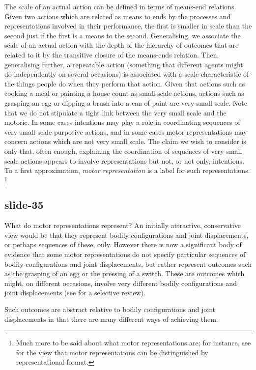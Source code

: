 \documentclass[12pt,\papersize]{extarticle}
\begin{document}
The scale of an actual action can be defined in terms of means-end relations.
Given two actions which are related as means to ends by the processes and representations
involved in their performance, the first is smaller in scale than the second just if the
first is a means to the second.  Generalising, we associate the scale of an actual action
with the depth of the hierarchy of outcomes that are related to it by the transitive closure
of the means-ends relation.  Then, generalising further, a repeatable action (something that
different agents might do independently on several occasions) is associated with a scale
characteristic of the things people do when they perform that action.  Given that actions
such as cooking a meal or painting a house count as small-scale actions, actions such as
grasping an egg or dipping a brush into a can of paint are very-small scale.  Note that we
do not stipulate a tight link between the very small scale and the motoric.  In some cases
intentions may play a role in coordinating sequences of very small scale purposive actions,
and in some cases motor representations may concern actions which are not very small scale.
The claim we wish to consider is only that, often enough, explaining the coordination of
sequences of very small scale actions appears to involve representations but not, or not
only, intentions.  To a first approximation, \emph{motor representation} is a label for
such representations.%
\footnote{%
Much more to be said about what motor representations are; for instance, see \citet{butterfill:2012_intention} for the view that motor representations can be distinguished by representational format.
}

\subsection{slide-35}
What do motor representations represent? An initially attractive, conservative
view would be that they represent bodily configurations and joint displacements,
or perhaps sequences of these, only.
However there is now a significant body of evidence that some motor representations
do not specify particular sequences of bodily configurations and joint displacements,
but rather represent outcomes such as the grasping of an egg or the pressing of a switch.
These are outcomes which might, on different occasions, involve very different bodily
configurations and joint displacements
(see \citealp{rizzolatti_functional_2010} for a selective review).

Such outcomes are abstract relative to bodily configurations and joint displacements
in that there are many different ways of achieving them.
\end{document}

